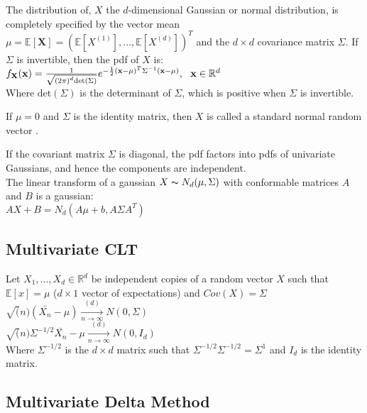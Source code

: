 The distribution of, $X$ the $d$-dimensional Gaussian or normal distribution, is completely specified by the vector mean $\mu =\mathbb E[\mathbf{X}]= (\mathbb E[X^{(1)}],\ldots ,\mathbb E[X^{(d)}])^ T$ and the $d \times d$ covariance matrix $\Sigma$. If $\Sigma$ is invertible, then the pdf of $X$ is:\\

$   f_{\mathbf X}(\mathbf x) = \frac{1}{\sqrt{\left(2\pi \right)^ d \text {det}(\Sigma )}}e^{-\frac{1}{2}(\mathbf x-\mu )^ T \Sigma ^{-1} (\mathbf x-\mu )}, ~ ~ ~ \\ \mathbf x\in \mathbb {R}^ d$\\


Where $\text {det}(\Sigma )$ is the determinant of $\Sigma$, which is positive when $\Sigma$ is invertible.

If $\mu = 0$ and $\Sigma$ is the identity matrix, then $X$ is called a standard normal random vector .

If the covariant matrix $\Sigma$ is diagonal, the pdf factors into pdfs of univariate Gaussians, and hence the components are independent.\\

The linear transform of a gaussian $X \thicksim N_d(\mu,\Sigma)$ with conformable matrices $A$ and $B$ is a gaussian:\\ 

$AX + B = N_d(A\mu + b, A \Sigma A^T)$

\subsection*{Multivariate CLT}

Let $X_1, \ldots, X_d \in \mathbb{R}^d$ be independent copies of a random vector $X$
such that $\mathbb{E}[x] = \mu$ ($d \times 1$ vector of expectations) and $Cov(X)= \Sigma$\\

$\sqrt(n)(\bar{X_n}-\mu) \xrightarrow[n \rightarrow \infty]{(d)} N(0,\Sigma)$\\

$\sqrt(n) \Sigma^{-1/2} \bar{X_n}-\mu \xrightarrow[n \rightarrow \infty]{(d)} N(0,I_d)$\\

Where $\Sigma^{-1/2}$ is the $d \times d$ matrix such that $\Sigma^{-1/2} \Sigma^{-1/2} = \Sigma^{1}$ and $I_d$ is the identity matrix.\\

\subsection*{Multivariate Delta Method}
